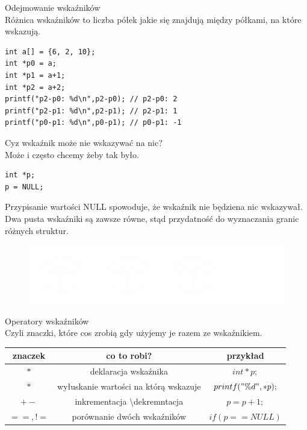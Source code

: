 \documentclass[notheorems, aspectratio=54]{beamer}
\begin{document}
\begin{frame}[fragile]
	Odejmowanie wskaźników\\
	
	Różnica wskaźników to liczba półek jakie się znajdują między półkami, na które wskazują.
	
	\begin{lstlisting}
int a[] = {6, 2, 10};
int *p0 = a;
int *p1 = a+1;
int *p2 = a+2;
printf("p2-p0: %d\n",p2-p0); // p2-p0: 2
printf("p2-p1: %d\n",p2-p1); // p2-p1: 1
printf("p0-p1: %d\n",p0-p1); // p0-p1: -1
	\end{lstlisting}
	
\end{frame}

\begin{frame}[fragile]
	Cyz wskaźnik może nie wskazywać na nic?\\
	Może i często chcemy żeby tak było.
	\begin{lstlisting}
int *p;
p = NULL;
	\end{lstlisting}
	
	Przypisanie wartości NULL spowoduje, że wskaźnik nie będziena nic wskazywał.\\
	Dwa pusta wskaźniki są zawsze równe, stąd przydatność do wyznaczania granic różnych struktur.
	\begin{figure}
		\includegraphics[width=0.9\linewidth]{lista}
	\end{figure}
\end{frame}

\begin{frame}[fragile]
	Operatory wskaźników\\
	Czyli znaczki, które cos zrobią gdy użyjemy je razem ze wskaźnikiem.\\
	\center
	\begin{tabular}{ |c |c | c |}
		\hline
		znaczek  & co to robi?                               & przykład              \\ 
		\hline
		$*$      & deklaracja wskaźnika                     & $int *p;$              \\ 
		\hline
		$*$      & wyłuskanie wartości na którą wskazuje & $printf(" \% d", *p);$ \\ 
		\hline
		
		$+-$     & inkrementacja \textbackslash dekremntacja & $p = p + 1;$           \\ 
		\hline
		$==, !=$ & porównanie dwóch wskaźników           & $if(p == NULL)$        \\ 
		\hline
		
	\end{tabular}
\end{frame}
\end{document}
